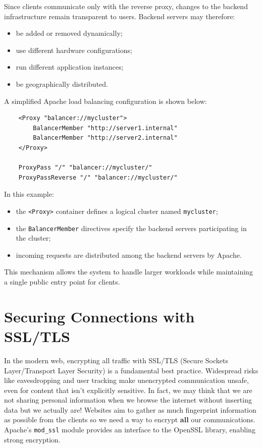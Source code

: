 \documentclass{scrbook}
\begin{document}
	Since clients communicate only with the reverse proxy, changes to the backend infrastructure remain transparent to users. Backend servers may therefore:
	\begin{itemize}
		\item
		be added or removed dynamically;
		
		\item
		use different hardware configurations;
		
		\item
		run different application instances;
		
		\item
		be geographically distributed.
	\end{itemize}
	
	A simplified Apache load balancing configuration is shown below:
	
	\begin{lstlisting}
	<Proxy "balancer://mycluster">
		BalancerMember "http://server1.internal"
		BalancerMember "http://server2.internal"
	</Proxy>
		
	ProxyPass "/" "balancer://mycluster/"
	ProxyPassReverse "/" "balancer://mycluster/"
	\end{lstlisting}
	
	In this example:
	\begin{itemize}
		\item the \texttt{<Proxy>} container defines a logical cluster named \texttt{mycluster};
		
		\item the \texttt{BalancerMember} directives specify the backend servers participating in the cluster;
		
		\item incoming requests are distributed among the backend servers by Apache.
	\end{itemize}
	
	This mechanism allows the system to handle larger workloads while maintaining a single public entry point for clients.
	
	\section{Securing Connections with SSL/TLS}
	
	In the modern web, encrypting all traffic with SSL/TLS (Secure Sockets Layer/Transport Layer Security) is a fundamental best practice. Widespread risks like eavesdropping and user tracking make unencrypted communication unsafe, even for content that isn't explicitly sensitive. In fact, we may think that we are not sharing personal information when we browse the internet without inserting data but we actually are! Websites aim to gather as much fingerprint information as possible from the clients so we need a way to encrypt \textbf{all} our communications. Apache's \texttt{mod\_ssl} module provides an interface to the OpenSSL library, enabling strong encryption.
	
\end{document}
